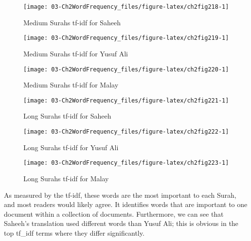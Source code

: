 \documentclass[
]{article}
\begin{document}
\begin{figure}

{\centering \texttt{[image: 03-Ch2WordFrequency\_files/figure-latex/ch2fig218-1]} 

}

\caption{Medium Surahs tf-idf for Saheeh}\label{fig:ch2fig218}
\end{figure}

\begin{figure}

{\centering \texttt{[image: 03-Ch2WordFrequency\_files/figure-latex/ch2fig219-1]} 

}

\caption{Medium Surahs tf-idf for Yusuf Ali}\label{fig:ch2fig219}
\end{figure}

\begin{figure}

{\centering \texttt{[image: 03-Ch2WordFrequency\_files/figure-latex/ch2fig220-1]} 

}

\caption{Medium Surahs tf-idf for Malay}\label{fig:ch2fig220}
\end{figure}

\begin{figure}

{\centering \texttt{[image: 03-Ch2WordFrequency\_files/figure-latex/ch2fig221-1]} 

}

\caption{Long Surahs tf-idf for Saheeh}\label{fig:ch2fig221}
\end{figure}

\begin{figure}

{\centering \texttt{[image: 03-Ch2WordFrequency\_files/figure-latex/ch2fig222-1]} 

}

\caption{Long Surahs tf-idf for Yusuf Ali}\label{fig:ch2fig222}
\end{figure}

\begin{figure}

{\centering \texttt{[image: 03-Ch2WordFrequency\_files/figure-latex/ch2fig223-1]} 

}

\caption{Long Surahs tf-idf for Malay}\label{fig:ch2fig223}
\end{figure}

As measured by the tf-idf, these words are the most important to each Surah, and most readers would likely agree. It identifies words that are important to one document within a collection of documents. Furthermore, we can see that Saheeh's translation used different words than Yusuf Ali; this is obvious in the top tf\_idf terms where they differ significantly.
\end{document}
